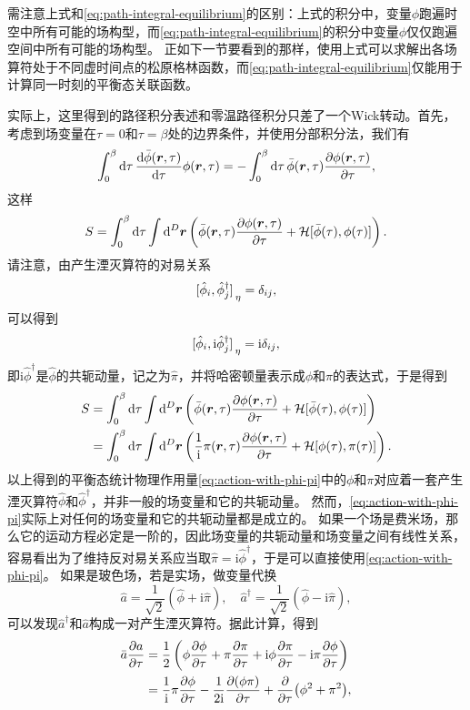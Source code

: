 \documentclass[hyperref, UTF8, a4paper]{ctexart}
\newcommand*{\ii}{\mathrm{i}}
\begin{document}
需注意上式和\eqref{eq:path-integral-equilibrium}的区别：上式的积分中，变量$\phi$跑遍时空中所有可能的场构型，而\eqref{eq:path-integral-equilibrium}的积分中变量$\phi$仅仅跑遍空间中所有可能的场构型。
正如下一节要看到的那样，使用上式可以求解出各场算符处于不同虚时间点的松原格林函数，而\eqref{eq:path-integral-equilibrium}仅能用于计算同一时刻的平衡态关联函数。

实际上，这里得到的路径积分表述和零温路径积分只差了一个Wick转动。首先，考虑到场变量在$\tau=0$和$\tau=\beta$处的边界条件，并使用分部积分法，我们有
\[
    \int_0^\beta \dd{\tau} \dv{\bar{\phi}(\vb*{r}, \tau)}{\tau} \phi(\vb*{r}, \tau) = - \int_0^\beta \dd{\tau} \bar{\phi}(\vb*{r}, \tau) \pdv{\phi(\vb*{r}, \tau)}{\tau},
\]
这样
\[
    S = \int_0^\beta \dd{\tau} \int \dd[D]{\vb*{r}} \left( \bar{\phi}(\vb*{r}, \tau) \pdv{\phi(\vb*{r}, \tau)}{\tau} + \mathcal{H}[\bar{\phi}(\tau), \phi(\tau)] \right).
\]
请注意，由产生湮灭算符的对易关系
\[
    \comm*{\hat{\phi}_i}{\hat{\phi}_j^\dagger}_\eta = \delta_{ij},
\]
可以得到
\[
    \comm*{\hat{\phi}_i}{\ii \hat{\phi}_j^\dagger}_\eta = \ii \delta_{ij},
\]
即$\ii \hat{\phi}^\dagger$是$\hat{\phi}$的共轭动量，记之为$\hat{\pi}$，并将哈密顿量表示成$\phi$和$\pi$的表达式，于是得到
\begin{equation}
    \begin{aligned}
        S &= \int_0^\beta \dd{\tau} \int \dd[D]{\vb*{r}} \left( \bar{\phi}(\vb*{r}, \tau) \pdv{\phi(\vb*{r}, \tau)}{\tau} + \mathcal{H}[\bar{\phi}(\tau), \phi(\tau)] \right) \\
        &= \int_0^\beta \dd{\tau} \int \dd[D]{\vb*{r}} \left( \frac{1}{\ii} \pi(\vb*{r}, \tau) \pdv{\phi(\vb*{r}, \tau)}{\tau} + \mathcal{H}[\phi(\tau), \pi(\tau)] \right).
    \end{aligned}
    \label{eq:action-with-phi-pi}
\end{equation}
以上得到的平衡态统计物理作用量\eqref{eq:action-with-phi-pi}中的$\phi$和$\pi$对应着一套产生湮灭算符$\hat{\phi}$和$\hat{\phi}^\dagger$，并非一般的场变量和它的共轭动量。
然而，\eqref{eq:action-with-phi-pi}实际上对任何的场变量和它的共轭动量都是成立的。
如果一个场是费米场，那么它的运动方程必定是一阶的，因此场变量的共轭动量和场变量之间有线性关系，容易看出为了维持反对易关系应当取$\hat{\pi} = \ii \hat{\phi}^\dagger$，于是可以直接使用\eqref{eq:action-with-phi-pi}。
如果是玻色场，若是实场，做变量代换
\[
    \hat{a} = \frac{1}{\sqrt{2}} (\hat{\phi} + \ii \hat{\pi}), \quad \hat{a}^\dagger = \frac{1}{\sqrt{2}} (\hat{\phi} - \ii \hat{\pi}),
\]
可以发现$\hat{a}^\dagger$和$\hat{a}$构成一对产生湮灭算符。据此计算，得到
\[
    \begin{aligned}
        \bar{a} \pdv{a}{\tau} &= \frac{1}{2} \left( \phi \pdv{\phi}{\tau} + \pi \pdv{\pi}{\tau} + \ii \phi \pdv{\pi}{\tau} - \ii \pi \pdv{\phi}{\tau} \right) \\
        &= \frac{1}{\ii} \pi \pdv{\phi}{\tau} - \frac{1}{2\ii} \pdv{(\phi \pi)}{\tau} + \pdv{\tau} (\phi^2 + \pi^2), 
    \end{aligned}
\]
\end{document}
